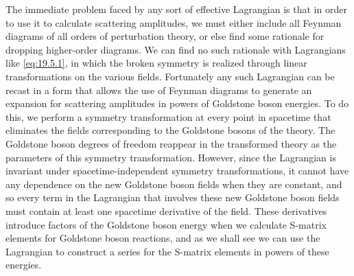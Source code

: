 The immediate problem faced by any sort of effective Lagrangian is that in order to use it to calculate scattering amplitudes, we must either include all Feynman diagrams of all orders of perturbation theory, or else find some rationale for dropping higher-order diagrams. We can find no such rationale with Lagrangians like \eqref{eq:19.5.1}, in which the broken symmetry is realized through linear transformations on the various fields. Fortunately any such Lagrangian can be recast in a form that allows the use of Feynman diagrams to generate an expansion for scattering amplitudes in powers of Goldstone boson energies. To do this, we perform a symmetry transformation at every point in spacetime that eliminates the fields corresponding to the Goldstone bosons of the theory. The Goldstone boson degrees of freedom reappear in the transformed theory as the parameters of this symmetry transformation. However, since the Lagrangian is invariant under spacetime-independent symmetry transformations, it cannot have any dependence on the new Goldstone boson fields when they are constant, and so every term in the Lagrangian that involves these new Goldstone boson fields must contain at least one spacetime derivative of the field. These derivatives introduce factors of the Goldstone boson energy when we calculate S-matrix elements for Goldstone boson reactions, and as we shall see we can use the Lagrangian to construct a series for the S-matrix elements in powers of these energies.

